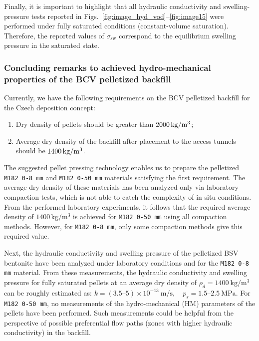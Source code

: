 Finally, it is important to highlight that all hydraulic conductivity and
swelling-pressure tests reported in Figs.~\ref{fig:image_hyd_vod}–\ref{fig:image15}
were performed under fully saturated conditions (constant-volume saturation).
Therefore, the reported values of
$\sigma_{\text{sw}}$ correspond to the equilibrium swelling pressure in the
saturated state.

\subsubsection{Concluding remarks to achieved hydro-mechanical properties of the BCV pelletized backfill}

Currently, we have the following requirements on the \acrshort{BCV} pelletized
backfill for the Czech deposition concept:
\begin{enumerate}
    \item Dry density of pellets should be greater than $2000 \,\mathrm{kg/m^3}$;
    \item Average dry density of the backfill after placement to the access tunnels\\ should be $1400 \,\mathrm{kg/m^3}$.
\end{enumerate}
The suggested pellet pressing technology enables us to prepare the pelletized
\texttt{M182 0-8 mm} and \texttt{M182 0-50 mm} materials satisfying the first
requirement. The average dry density of these materials has been analyzed only
via laboratory compaction tests, which is not able to catch the complexity of
in situ conditions. From the performed laboratory experiments, it follows that
the required average density of $1400\,$kg/m$^3$ is achieved for
\texttt{M182 0-50 mm} using all compaction methods. However, for
\texttt{M182 0-8 mm}, only some compaction methods give this required value.

Next, the hydraulic conductivity and swelling pressure of the pelletized BSV
bentonite have been analyzed under laboratory conditions and for the
\texttt{M182 0-8 mm} material.
From these measurements, the hydraulic conductivity and swelling pressure for
fully saturated pellets at an average dry density of
$\rho_d = 1400 \ \mathrm{kg/m^3}$
can be roughly estimated as:
$k = (3.5\text{–}5) \times 10^{-13} \ \mathrm{m/s}, \quad p_s = 1.5\text{–}2.5 \ \mathrm{MPa}$.
For \texttt{M182 0-50 mm}, no measurements of the hydro-mechanical (HM)
parameters of the pellets have been performed. Such measurements could be
helpful from the perspective of possible preferential flow paths (zones with
higher hydraulic conductivity) in the backfill.

